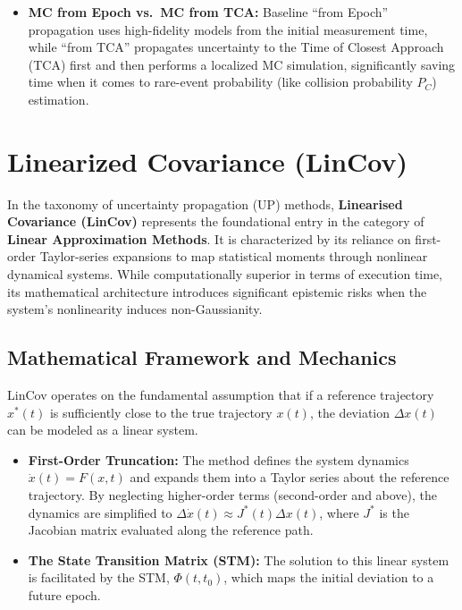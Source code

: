 \documentclass[
  letterpaper,
  DIV=11,
  numbers=noendperiod,
  oneside]{scrartcl}
\begin{document}
\begin{itemize}
  coverage of each input dimension, reducing variance and improving
  efficiency for surrogate model training. When combined with machine
  learning surrogates (e.g., Random Forests) or variance-reduction
  techniques like Importance Sampling, LHS can achieve accurate
  uncertainty propagation with far fewer high-fidelity model
  evaluations, making it suitable for sensitivity analysis and outlier
  detection in high-dimensional astrodynamics problems.
\item
  \textbf{MC from Epoch vs.~MC from TCA:} Baseline ``from Epoch''
  propagation uses high-fidelity models from the initial measurement
  time, while ``from TCA'' propagates uncertainty to the Time of Closest
  Approach (TCA) first and then performs a localized MC simulation,
  significantly saving time when it comes to rare-event probability
  (like collision probability \(P_C\)) estimation.
\end{itemize}

\section{Linearized Covariance (LinCov)}\label{sec-lincov}

In the taxonomy of uncertainty propagation (UP) methods,
\textbf{Linearised Covariance (LinCov)} represents the foundational
entry in the category of \textbf{Linear Approximation Methods}. It is
characterized by its reliance on first-order Taylor-series expansions to
map statistical moments through nonlinear dynamical systems. While
computationally superior in terms of execution time, its mathematical
architecture introduces significant epistemic risks when the system's
nonlinearity induces non-Gaussianity.

\subsection{Mathematical Framework and
Mechanics}\label{mathematical-framework-and-mechanics}

LinCov operates on the fundamental assumption that if a reference
trajectory \(x^*(t)\) is sufficiently close to the true trajectory
\(x(t)\), the deviation \(\Delta x(t)\) can be modeled as a linear
system.

\begin{itemize}
\item
  \textbf{First-Order Truncation:} The method defines the system
  dynamics \(\dot{x}(t) = F(x, t)\) and expands them into a Taylor
  series about the reference trajectory. By neglecting higher-order
  terms (second-order and above), the dynamics are simplified to
  \(\Delta\dot{x}(t) \approx J^*(t)\Delta x(t)\), where \(J^*\) is the
  Jacobian matrix evaluated along the reference path.
\item
  \textbf{The State Transition Matrix (STM):} The solution to this
  linear system is facilitated by the STM, \(\Phi(t, t_0)\), which maps
  the initial deviation to a future epoch.
\end{itemize}
\end{document}
